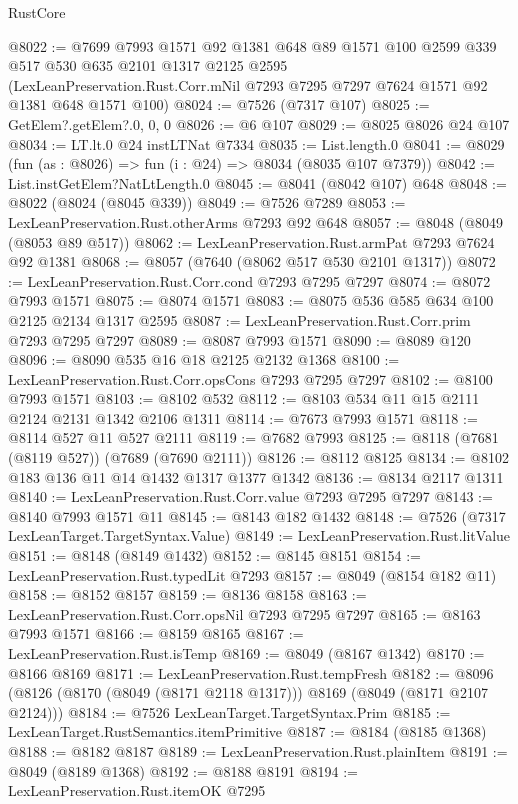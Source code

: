 \begin{lexlean}{RustCore}
\begin{coremodule}
@8022 := @7699
    @7993
    @1571
    @92
    @1381
    @648
    @89
    @1571
    @100
    @2599
    @339
    @517
    @530
    @635
    @2101
    @1317
    @2125
    @2595
    (LexLeanPreservation.Rust.Corr.mNil @7293 @7295 @7297 @7624 @1571 @92 @1381 @648 @1571 @100)
@8024 := @7526 (@7317 @107)
@8025 := GetElem?.getElem?.{0, 0, 0}
@8026 := @6 @107
@8029 := @8025 @8026 @24 @107
@8034 := LT.lt.{0} @24 instLTNat @7334
@8035 := List.length.{0}
@8041 := @8029 (fun (as : @8026) => fun (i : @24) => @8034 (@8035 @107 @7379))
@8042 := List.instGetElem?NatLtLength.{0}
@8045 := @8041 (@8042 @107) @648
@8048 := @8022 (@8024 (@8045 @339))
@8049 := @7526 @7289
@8053 := LexLeanPreservation.Rust.otherArms @7293 @92 @648
@8057 := @8048 (@8049 (@8053 @89 @517))
@8062 := LexLeanPreservation.Rust.armPat @7293 @7624 @92 @1381
@8068 := @8057 (@7640 (@8062 @517 @530 @2101 @1317))
@8072 := LexLeanPreservation.Rust.Corr.cond @7293 @7295 @7297
@8074 := @8072 @7993 @1571
@8075 := @8074 @1571
@8083 := @8075 @536 @585 @634 @100 @2125 @2134 @1317 @2595
@8087 := LexLeanPreservation.Rust.Corr.prim @7293 @7295 @7297
@8089 := @8087 @7993 @1571
@8090 := @8089 @120
@8096 := @8090 @535 @16 @18 @2125 @2132 @1368
@8100 := LexLeanPreservation.Rust.Corr.opsCons @7293 @7295 @7297
@8102 := @8100 @7993 @1571
@8103 := @8102 @532
@8112 := @8103 @534 @11 @15 @2111 @2124 @2131 @1342 @2106 @1311
@8114 := @7673 @7993 @1571
@8118 := @8114 @527 @11 @527 @2111
@8119 := @7682 @7993
@8125 := @8118 (@7681 (@8119 @527)) (@7689 (@7690 @2111))
@8126 := @8112 @8125
@8134 := @8102 @183 @136 @11 @14 @1432 @1317 @1377 @1342
@8136 := @8134 @2117 @1311
@8140 := LexLeanPreservation.Rust.Corr.value @7293 @7295 @7297
@8143 := @8140 @7993 @1571 @11
@8145 := @8143 @182 @1432
@8148 := @7526 (@7317 LexLeanTarget.TargetSyntax.Value)
@8149 := LexLeanPreservation.Rust.litValue
@8151 := @8148 (@8149 @1432)
@8152 := @8145 @8151
@8154 := LexLeanPreservation.Rust.typedLit @7293
@8157 := @8049 (@8154 @182 @11)
@8158 := @8152 @8157
@8159 := @8136 @8158
@8163 := LexLeanPreservation.Rust.Corr.opsNil @7293 @7295 @7297
@8165 := @8163 @7993 @1571
@8166 := @8159 @8165
@8167 := LexLeanPreservation.Rust.isTemp
@8169 := @8049 (@8167 @1342)
@8170 := @8166 @8169
@8171 := LexLeanPreservation.Rust.tempFresh
@8182 := @8096 (@8126 (@8170 (@8049 (@8171 @2118 @1317))) @8169 (@8049 (@8171 @2107 @2124)))
@8184 := @7526 LexLeanTarget.TargetSyntax.Prim
@8185 := LexLeanTarget.RustSemantics.itemPrimitive
@8187 := @8184 (@8185 @1368)
@8188 := @8182 @8187
@8189 := LexLeanPreservation.Rust.plainItem
@8191 := @8049 (@8189 @1368)
@8192 := @8188 @8191
@8194 := LexLeanPreservation.Rust.itemOK @7295

\end{coremodule}
\end{lexlean}

